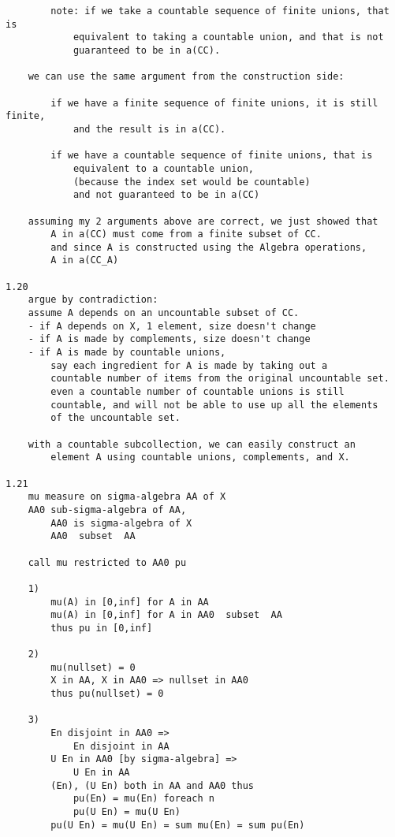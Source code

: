 \documentclass{article}
\begin{document}
\begin{flushleft}
\begin{verbatim}
        note: if we take a countable sequence of finite unions, that is 
            equivalent to taking a countable union, and that is not 
            guaranteed to be in a(CC).

    we can use the same argument from the construction side:

        if we have a finite sequence of finite unions, it is still finite, 
            and the result is in a(CC).

        if we have a countable sequence of finite unions, that is 
            equivalent to a countable union, 
            (because the index set would be countable)
            and not guaranteed to be in a(CC)

    assuming my 2 arguments above are correct, we just showed that 
        A in a(CC) must come from a finite subset of CC. 
        and since A is constructed using the Algebra operations, 
        A in a(CC_A)

1.20
    argue by contradiction:
    assume A depends on an uncountable subset of CC. 
    - if A depends on X, 1 element, size doesn't change 
    - if A is made by complements, size doesn't change 
    - if A is made by countable unions, 
        say each ingredient for A is made by taking out a 
        countable number of items from the original uncountable set.
        even a countable number of countable unions is still 
        countable, and will not be able to use up all the elements 
        of the uncountable set. 

    with a countable subcollection, we can easily construct an 
        element A using countable unions, complements, and X. 

1.21
    mu measure on sigma-algebra AA of X 
    AA0 sub-sigma-algebra of AA, 
        AA0 is sigma-algebra of X 
        AA0  subset  AA 

    call mu restricted to AA0 pu 

    1)
        mu(A) in [0,inf] for A in AA 
        mu(A) in [0,inf] for A in AA0  subset  AA 
        thus pu in [0,inf]

    2)
        mu(nullset) = 0
        X in AA, X in AA0 => nullset in AA0 
        thus pu(nullset) = 0

    3)
        En disjoint in AA0 =>
            En disjoint in AA
        U En in AA0 [by sigma-algebra] =>
            U En in AA 
        (En), (U En) both in AA and AA0 thus 
            pu(En) = mu(En) foreach n 
            pu(U En) = mu(U En)
        pu(U En) = mu(U En) = sum mu(En) = sum pu(En)


\end{verbatim}
\end{flushleft}
\end{document}
